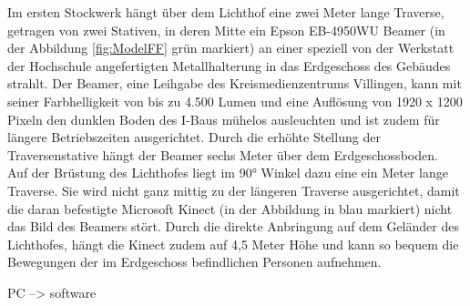 Im ersten Stockwerk hängt über dem Lichthof eine zwei Meter lange Traverse, getragen von zwei Stativen, in deren Mitte ein Epson EB-4950WU Beamer (in der Abbildung \autoref{fig:ModelFF} grün markiert) an einer speziell von der Werkstatt der Hochschule angefertigten Metallhalterung in das Erdgeschoss des Gebäudes strahlt. Der Beamer, eine Leihgabe des Kreismedienzentrums Villingen, kann mit seiner Farbhelligkeit von bis zu 4.500 Lumen und eine Auflösung von 1920 x 1200 Pixeln den dunklen Boden des I-Baus mühelos ausleuchten und ist zudem für längere Betriebszeiten ausgerichtet. Durch die erhöhte Stellung der Traversenstative hängt der Beamer sechs Meter über dem Erdgeschossboden. \\
Auf der Brüstung des Lichthofes liegt im 90° Winkel dazu eine ein Meter lange Traverse. Sie wird nicht ganz mittig zu der längeren Traverse ausgerichtet, damit die daran befestigte Microsoft Kinect (in der Abbildung in blau markiert) nicht das Bild des Beamers stört. Durch die direkte Anbringung auf dem Geländer des Lichthofes, hängt die Kinect zudem auf 4,5 Meter Höhe und kann so bequem die Bewegungen der im Erdgeschoss befindlichen Personen aufnehmen. 


PC --> software


